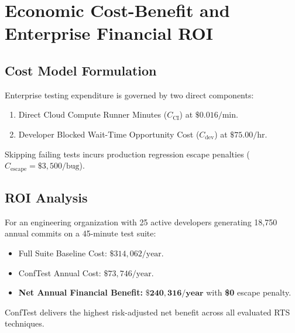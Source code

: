\chapter{Economic Cost-Benefit and Enterprise Financial ROI}

\section{Cost Model Formulation}
Enterprise testing expenditure is governed by two direct components:
\begin{enumerate}
    \item Direct Cloud Compute Runner Minutes ($C_{\text{CI}}$) at $\$0.016/\text{min}$.
    \item Developer Blocked Wait-Time Opportunity Cost ($C_{\text{dev}}$) at $\$75.00/\text{hr}$.
\end{enumerate}
Skipping failing tests incurs production regression escape penalties ($C_{\text{escape}} = \$3,500/\text{bug}$).

\section{ROI Analysis}
For an engineering organization with 25 active developers generating 18,750 annual commits on a 45-minute test suite:
\begin{itemize}
    \item Full Suite Baseline Cost: $\$314,062/\text{year}$.
    \item ConfTest Annual Cost: $\$73,746/\text{year}$.
    \item \textbf{Net Annual Financial Benefit:} $\mathbf{\$240,316/\text{year}}$ with \textbf{\$0} escape penalty.
\end{itemize}

ConfTest delivers the highest risk-adjusted net benefit across all evaluated RTS techniques.

